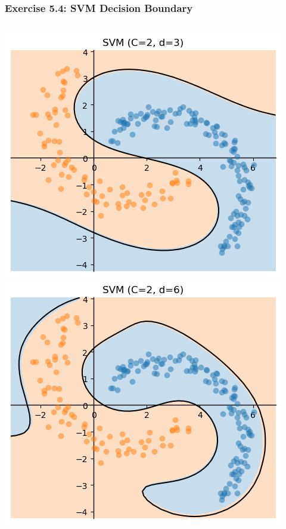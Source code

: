 \documentclass[10pt,aspectratio=169,handout]{beamer}
\begin{document}
\begin{frame}
    \frametitle{Exercise 5.4: SVM Decision Boundary}

    \begin{columns}
        \begin{column}{0.3\textwidth}
            \centering
            \includegraphics[height=0.4\textheight]{images/task5-4-d_3.png}
            \includegraphics[height=0.4\textheight]{images/task5-4-d_6.png}
        \end{column}
        \begin{column}{0.3\textwidth}

\end{column}
\end{columns}
\end{frame}
\end{document}
